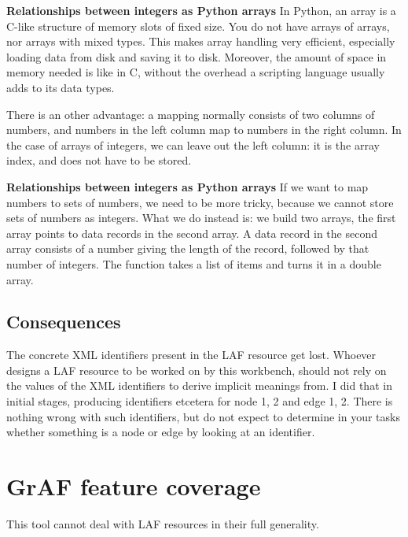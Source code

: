 \documentclass[letterpaper,10pt,english]{sphinxmanual}
\begin{document}
\textbf{Relationships between integers as Python arrays}
In Python, an array is a C-like structure of memory slots of fixed size.
You do not have arrays of arrays, nor arrays with mixed types.
This makes array handling very efficient, especially loading data from disk and saving it to disk.
Moreover, the amount of space in memory needed is like in C, without the overhead a scripting language usually adds to its data types.

There is an other advantage:
a mapping normally consists of two columns of numbers, and numbers in the left column map to numbers in the right column.
In the case of arrays of integers, we can leave out the left column: it is the array index, and does not have to be stored.

\textbf{Relationships between integers as Python arrays}
If we want to map numbers to sets of numbers,
we need to be more tricky, because we cannot store sets of numbers as integers.
What we do instead is: we build two arrays, the first array points to data records in the second array.
A data record in the second array consists of a number giving the length of the record,
followed by that number of integers.
The function {\hyperref[graf/graf:graf.model.arrayify]{}} takes a list of items and turns it in a double array.


\subsection{Consequences}
\label{workbench:consequences}
The concrete XML identifiers present in the LAF resource get lost.
Whoever designs a LAF resource to be worked on by this workbench,
should not rely on the values of the XML identifiers to derive implicit meanings from.
I did that in initial stages, producing identifiers  etcetera for node 1, 2 and edge 1, 2.
There is nothing wrong with such identifiers, but do not expect to determine in your tasks whether
something is a node or edge by looking at an identifier.


\section{GrAF feature coverage}
\label{workbench:feature-coverage}\label{workbench:graf-feature-coverage}
This tool cannot deal with LAF resources in their full generality.
\end{document}

